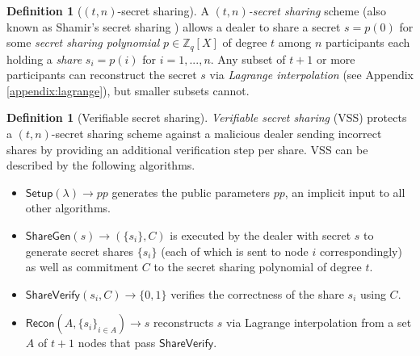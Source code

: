 \documentclass[conference]{IEEEtran}
\theoremstyle{definition}
\newtheorem{definition}[theorem]{Definition}
\theoremstyle{remark}
\begin{document}
\begin{definition}[$(t, n)$-secret sharing]
A \textit{$(t, n)$-secret sharing} scheme (also known as Shamir's secret sharing \cite{shamir1979share}) allows a dealer to share a secret $s = p(0)$ for some \textit{secret sharing polynomial} $p \in \mathbb{Z}_q[X]$ of degree $t$ among $n$ participants each holding a \textit{share} $s_i = p(i)$ for $i = 1, ..., n$. Any subset of $t + 1$ or more participants can reconstruct the secret $s$ via \textit{Lagrange interpolation} (see Appendix \ref{appendix:lagrange}), but smaller subsets cannot.
\end{definition}

\begin{definition}[Verifiable secret sharing]
\textit{Verifiable secret sharing} (VSS) \cite{feldman1987practical, pedersen1991non} protects a $(t, n)$-secret sharing scheme against a malicious dealer sending incorrect shares by providing an additional verification step per share. VSS can be described by the following algorithms.
\begin{itemize}
    \item $\mathsf{Setup}(\lambda) \rightarrow pp$ generates the public parameters $pp$, an implicit input to all other algorithms.
    \item $\mathsf{ShareGen}(s) \rightarrow (\{s_i\}, C)$ is executed by the dealer with secret $s$ to generate secret shares $\{s_i\}$ (each of which is sent to node $i$ correspondingly) as well as commitment $C$ to the secret sharing polynomial of degree $t$.
    \item $\mathsf{ShareVerify}(s_i, C) \rightarrow \{0, 1\}$ verifies the correctness of the share $s_i$ using $C$.
    \item $\mathsf{Recon}(A, \{s_i\}_{i \in A}) \rightarrow s$ reconstructs $s$ via Lagrange interpolation from a set $A$ of $t + 1$ nodes that pass $\mathsf{ShareVerify}$.
\end{itemize}
\end{definition}
\end{document}

